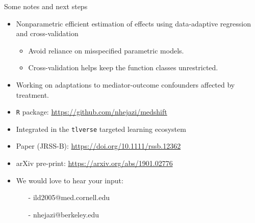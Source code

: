 \documentclass{beamer}
\begin{document}

\begin{frame}{Some notes and next steps}
  \begin{itemize}
  \item Nonparametric efficient estimation of effects using
    data-adaptive regression and cross-validation
    \begin{itemize}
      \item Avoid reliance on misspecified parametric models.
      \item Cross-validation helps keep the function classes unrestricted.
    \end{itemize}
  \item Working on adaptations to mediator-outcome confounders
    affected by treatment.
  \item \texttt{R} package: \url{https://github.com/nhejazi/medshift}
  \item Integrated in the \texttt{tlverse} targeted learning ecosystem
  \item Paper (JRSS-B): \url{https://doi.org/10.1111/rssb.12362}
  \item arXiv pre-print: \url{https://arxiv.org/abs/1901.02776}
  \item We would love to hear your input:
    \begin{itemize}
    \item[-] ild2005@med.cornell.edu
    \item[-] nhejazi@berkeley.edu
    \end{itemize}
  \end{itemize}

\note{
}

\end{frame}


\setbeamercovered{}
\beamerdefaultoverlayspecification{}

\begin{frame}[c,allowframebreaks]{}

\scriptsize



\end{frame}

\end{document}
